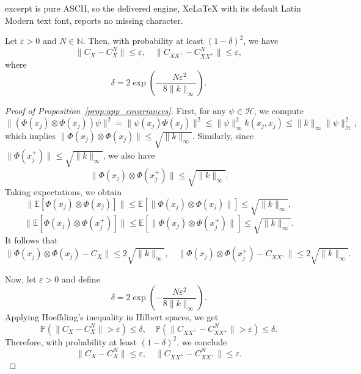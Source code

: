 \documentclass[10pt,a4paper]{amsart}
\newcommand{\E}{\mathbb{E}} %
\renewcommand{\H}{\mathcal{H}}
\begin{document}
excerpt is pure ASCII, so the delivered engine, XeLaTeX with its default Latin Modern text font, reports no missing character.
\begin{prop}
\label{prop:app_covariances}
Let \( \varepsilon > 0 \) and \( N \in \mathbb{N} \). Then, with probability at least \( (1 - \delta)^2 \), we have
\[
\| C_{X} - C_{X}^N \| \leq \varepsilon, \quad \| C_{XX^+} - C_{XX^+}^N \| \leq \varepsilon,
\]
where
\[
\delta = 2 \exp\left( -\frac{N \varepsilon^2}{8 \| k \|_\infty} \right).
\]
\end{prop}

\begin{proof}[Proof of Proposition~\ref{prop:app_covariances}]
First, for any \( \psi \in \H \), we compute
\[
\| (\Phi(x_j) \otimes \Phi(x_j)) \psi \|^2 = \| \psi(x_j) \Phi(x_j) \|^2 \leq \| \psi \|_\infty^2 k(x_j, x_j) \leq \| k \|_\infty \| \psi \|_\H^2,
\]
which implies \( \| \Phi(x_j) \otimes \Phi(x_j) \| \leq \sqrt{ \| k \|_\infty } \). Similarly, since \( \| \Phi(x_j^+) \| \leq \sqrt{ \| k \|_\infty } \), we also have
\[
\| \Phi(x_j) \otimes \Phi(x_j^+) \| \leq \sqrt{ \| k \|_\infty }.
\]
Taking expectations, we obtain
\[
\| \E[ \Phi(x_j) \otimes \Phi(x_j) ] \| \leq \E[ \| \Phi(x_j) \otimes \Phi(x_j) \| ] \leq \sqrt{ \| k \|_\infty },
\]
\[
\| \E[ \Phi(x_j) \otimes \Phi(x_j^+) ] \| \leq \E[ \| \Phi(x_j) \otimes \Phi(x_j^+) \| ] \leq \sqrt{ \| k \|_\infty }.
\]
It follows that
\[
\| \Phi(x_j) \otimes \Phi(x_j) - C_X \| \leq 2 \sqrt{ \| k \|_\infty }, \quad \| \Phi(x_j) \otimes \Phi(x_j^+) - C_{XX^+} \| \leq 2 \sqrt{ \| k \|_\infty }.
\]

Now, let \( \varepsilon > 0 \) and define
\[
\delta = 2 \exp\left( -\frac{N \varepsilon^2}{8 \| k \|_\infty} \right).
\]
Applying Hoeffding's inequality in Hilbert spaces, we get
\[
\mathbb{P}\left( \| C_X - C_X^N \| > \varepsilon \right) \leq \delta, \quad 
\mathbb{P}\left( \| C_{XX^+} - C_{XX^+}^N \| > \varepsilon \right) \leq \delta.
\]
Therefore, with probability at least \( (1 - \delta)^2 \), we conclude
\[
\| C_X - C_X^N \| \leq \varepsilon, \quad \| C_{XX^+} - C_{XX^+}^N \| \leq \varepsilon.
\]
\end{proof}
\end{document}
